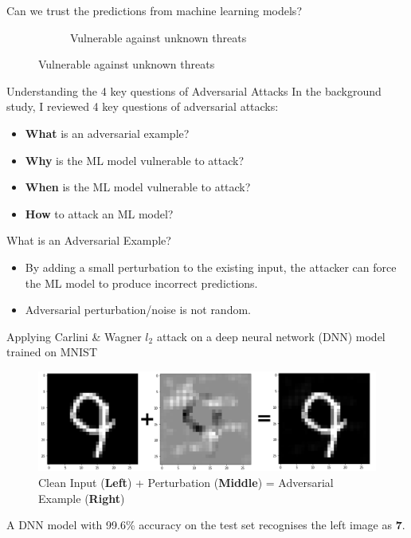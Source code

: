 \documentclass[9pt]{beamer}
\begin{document}
\begin{frame}{Can we trust the predictions from machine learning models?}
\begin{figure}
\begin{subfigure}[t]{0.30\linewidth}
        \caption{Vulnerable against unknown threats}
    \end{subfigure}
\end{figure}
\end{frame}

\begin{frame}{Understanding the 4 key questions of Adversarial Attacks}
In the background study, I reviewed 4 key questions of adversarial attacks:
\begin{itemize}
    \item \textbf{What} is an adversarial example?
    \item \textbf{Why} is the ML model vulnerable to attack?
    \item \textbf{When} is the ML model vulnerable to attack?
    \item \textbf{How} to attack an ML model?
\end{itemize}

\end{frame}

\begin{frame}{What is an Adversarial Example?}
\begin{itemize}
    \item By adding a small perturbation to the existing input, the attacker can force the ML model to produce incorrect predictions.
    \item Adversarial perturbation/noise is not random.
\end{itemize}

\begin{examples}
    Applying Carlini \& Wagner $l_2$ attack on a deep neural network (DNN) model trained on MNIST
    \begin{figure}
        \centering
        \scriptsize
        \includegraphics[width=0.7\linewidth]{images/from9to7.png}
        \caption{Clean Input (\textbf{Left}) + Perturbation (\textbf{Middle}) = Adversarial Example (\textbf{Right})}
    \end{figure}
    A DNN model with 99.6\% accuracy on the test set recognises the left image as \textbf{7}.
\end{examples}
\end{frame}
\end{document}
